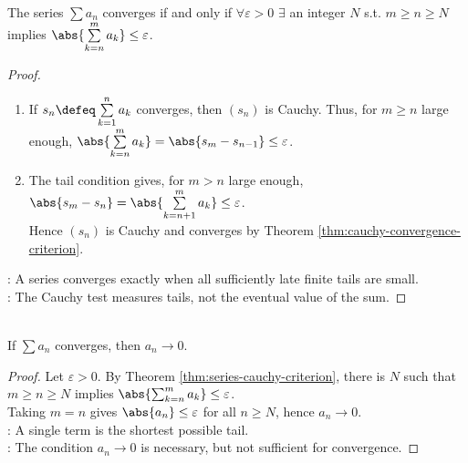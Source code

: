 \begin{theorem} \label{thm:series-cauchy-criterion}\label{thm:series-main-results-source-todo} \\
The series $\sum a_n$ converges if and only if $\forall \varepsilon>0$ $\exists$ an integer $N$ s.t. $m\geq n\geq N$ implies $\abs{\sum\limits_{k=n}^{m}a_k}\leq\varepsilon$.
\begin{proof}
\begin{enumerate}[label=\roman*.]
\setlength{\itemsep}{0pt}
\item[$(\Rightarrow)$] If $s_n\defeq\sum\limits_{k=1}^{n}a_k$ converges, then $(s_n)$ is Cauchy. Thus, for $m\geq n$ large enough, $\abs{\sum\limits_{k=n}^{m}a_k}=\abs{s_m-s_{n-1}}\leq\varepsilon$.
\item[$(\Leftarrow)$] The tail condition gives, for $m>n$ large enough, $\abs{s_m-s_n}=\abs{\sum\limits_{k=n+1}^{m}a_k}\leq\varepsilon$.\\
Hence $(s_n)$ is Cauchy and converges by Theorem \ref{thm:cauchy-convergence-criterion}.
\end{enumerate}
: A series converges exactly when all sufficiently late finite tails are small.\\
: The Cauchy test measures tails, not the eventual value of the sum.
\end{proof}
\end{theorem}

\begin{corollary} \label{cor:series-terms-tend-to-zero} \\
If $\sum a_n$ converges, then $a_n\to0$.
\begin{proof}
Let $\varepsilon>0$. By Theorem \ref{thm:series-cauchy-criterion}, there is $N$ such that $m\geq n\geq N$ implies $\abs{\sum_{k=n}^{m}a_k}\leq\varepsilon$.\\
Taking $m=n$ gives $\abs{a_n}\leq\varepsilon$ for all $n\geq N$, hence $a_n\to0$.\\
: A single term is the shortest possible tail.\\
: The condition $a_n\to0$ is necessary, but not sufficient for convergence.
\end{proof}
\end{corollary}

